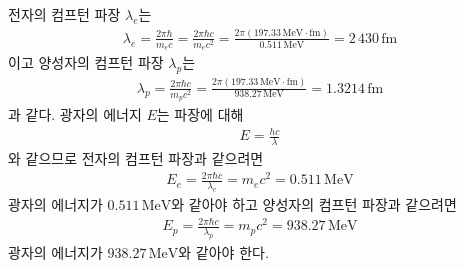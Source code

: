 \documentclass[tightenlines,floatfix,nofootinbib,superscriptaddress,fleqn]{revtex4}
\begin{document}
전자의 컴프턴 파장 $\lambda_e$는
\begin{align}
  \lambda_e = \frac{2\pi\hbar}{m_e c}= \frac{2\pi\hbar c}{m_e c^2}
  =\frac{2\pi(197.33\,\mathrm{MeV\cdot
  fm})}{0.511\, \mathrm{MeV}}
  =2\,430\,\mathrm{fm}
\end{align}
이고 양성자의 컴프턴 파장 $\lambda_p$는
\begin{align}
  \lambda_p=\frac{2\pi\hbar c}{m_p c^2}
  =\frac{2\pi(197.33\,\mathrm{MeV\cdot
  fm})}{938.27\, \mathrm{MeV}}
  =1.3214\,\mathrm{fm}
\end{align}
과 같다. 광자의 에너지 $E$는 파장에 대해
\begin{align}
  E = \frac{hc}{\lambda}
\end{align}
와 같으므로 전자의 컴프턴 파장과 같으려면 
\begin{align}
  E_e = \frac{2\pi \hbar c}{\lambda_e} = m_ec^2 = 0.511\,\mathrm{MeV}
\end{align}
광자의 에너지가 $0.511\,\mathrm{MeV}$와 같아야 하고
양성자의 컴프턴 파장과 같으려면
\begin{align}
  E_p = \frac{2\pi \hbar c}{\lambda_p} = m_pc^2 = 938.27\,\mathrm{MeV}
\end{align}
광자의 에너지가 $938.27\,\mathrm{MeV}$와 같아야 한다.
\vspace{1cm}
  
\end{document}
